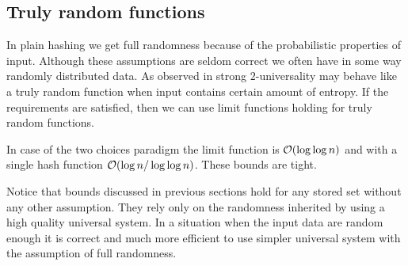 \subsection{Truly random functions}
\label{subsection-truly-random-functions}
In plain hashing we get full randomness because of the probabilistic properties of input. Although these assumptions are seldom correct we often have in some way randomly distributed data. As observed in \cite{DBLP:conf/soda/MitzenmacherV08} strong $2$-universality may behave like a truly random function when input contains certain amount of entropy. If the requirements are satisfied, then we can use limit functions holding for truly random functions.

In case of the two choices paradigm the limit function is $\mathcal{O}(\log \log n)$ and with a single hash function $\mathcal{O}(\log n / \log \log n)$. These bounds are tight.

Notice that bounds discussed in previous sections hold for any stored set without any other assumption. They rely only on the randomness inherited by using a high quality universal system. In a situation when the input data are random enough it is correct and much more efficient to use simpler universal system with the assumption of full randomness.
